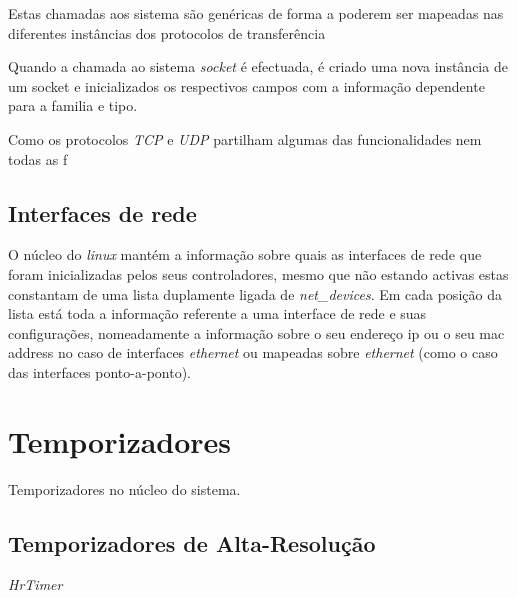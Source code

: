 Estas chamadas aos sistema são genéricas de forma a poderem ser mapeadas nas
diferentes instâncias dos protocolos de transferência

Quando a chamada ao sistema \textit{socket} é efectuada, é criado uma nova
instância de um socket e inicializados os respectivos campos com a informação
dependente para a familia e tipo. 


Como os protocolos \textit{TCP} e \textit{UDP} partilham algumas das
funcionalidades nem todas as f

\subsection{Interfaces de rede}

O núcleo do \textit{linux} mantém a informação sobre quais as interfaces de
rede que foram inicializadas pelos seus controladores, mesmo que não estando
activas estas constantam de uma lista duplamente ligada de
\textit{net\_devices}. Em cada posição da lista está toda a informação
referente a uma interface de rede e suas configurações, nomeadamente a
informação sobre o seu endereço ip ou o seu mac address no caso de interfaces
\textit{ethernet} ou mapeadas sobre \textit{ethernet} (como o caso das
interfaces ponto-a-ponto).


\section{Temporizadores}

Temporizadores no núcleo do sistema.


\subsection{Temporizadores de Alta-Resolução}

\textit{HrTimer}

